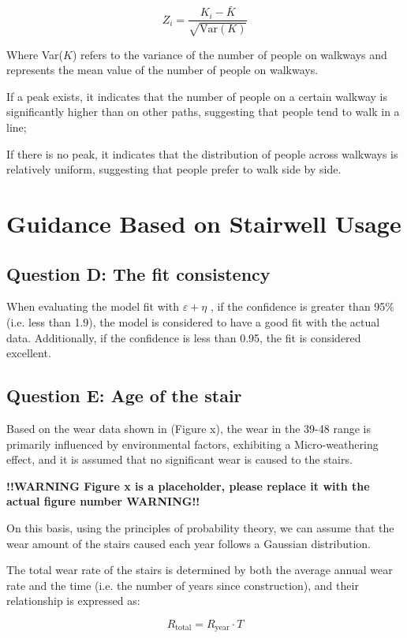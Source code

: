 \documentclass{mcmthesis}
\begin{document}
\[ Z_i = \frac{K_i - \bar{K}}{\sqrt{\text{Var}(K)}} \]

Where Var($K$) refers to the variance of the number of people on walkways and represents the mean value of the number of people on walkways.



If a peak exists, it indicates that the number of people on a certain walkway is significantly higher than on other paths, suggesting that people tend to walk in a line;

If there is no peak, it indicates that the distribution of people across walkways is relatively uniform, suggesting that people prefer to walk side by side.

\section{Guidance Based on Stairwell Usage}
\subsection{Question D: The fit consistency}
When evaluating the model fit with $\varepsilon +\eta$ , if the confidence is greater than 95\% (i.e. less than 1.9), the model is considered to have a good fit with the actual data. Additionally, if the confidence is less than 0.95, the fit is considered excellent.
\subsection{Question E: Age of the stair }

Based on the wear data shown in (Figure x), the wear in the 39-48 range is primarily influenced by environmental factors, exhibiting a Micro-weathering effect, and it is assumed that no significant wear is caused to the stairs.

\textbf{!!WARNING Figure x is a placeholder, please replace it with the actual figure number WARNING!!}

On this basis, using the principles of probability theory, we can assume that the wear amount of the stairs caused each year follows a Gaussian distribution.

The total wear rate of the stairs is determined by both the average annual wear rate and the time (i.e. the number of years since construction), and their relationship is expressed as:

\[R_{\text{total}} = R_{\text{year}} \cdot T \]
\end{document}
